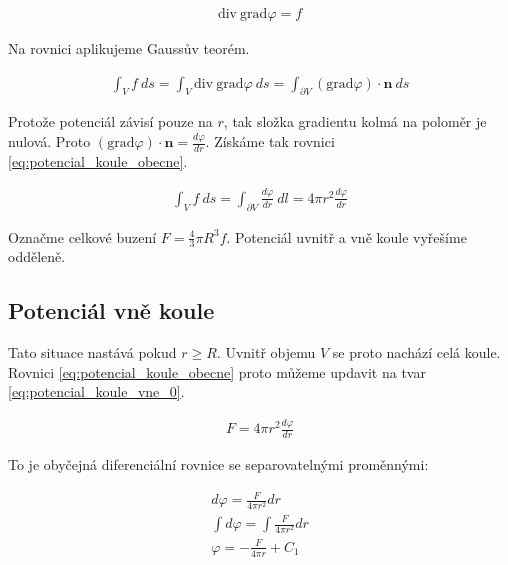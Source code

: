\documentclass{book}
\newcommand{\vect}[1]{\boldsymbol{#1}}
\newcommand{\grad}{\mathrm{grad}}
\newcommand{\diverg}{\mathrm{div}}
\begin{document}
\begin{equation}
\begin{split}
\diverg \ \grad \varphi = f
\end{split}
\end{equation}

Na rovnici aplikujeme Gaussův teorém.

\begin{equation}
\begin{split}
\int_V f \ ds = \int_V \diverg \ \grad \varphi \ ds = \int_{\partial V} (\grad \varphi) \cdot \vect{n} \ ds
\end{split}
\end{equation}

Protože potenciál závisí pouze na \(r\), tak složka gradientu kolmá na poloměr je nulová. Proto \((\grad \varphi) \cdot \vect{n} = \frac{d \varphi}{dr}\).
Získáme tak rovnici \eqref{eq:potencial_koule_obecne}.

\begin{equation}
\label{eq:potencial_koule_obecne}
\begin{split}
\int_V f \ ds = \int_{\partial V} \frac{d \varphi}{dr} \ dl = 4 \pi r^2 \frac{d \varphi}{dr}
\end{split}
\end{equation}

Označme celkové buzení \(F = \frac{4}{3} \pi R^3 f\).
Potenciál uvnitř a vně koule vyřešíme odděleně.

\subsection{Potenciál vně koule}

Tato situace nastává pokud \(r \geq R\). Uvnitř objemu \(V\) se proto nachází celá koule. Rovnici \eqref{eq:potencial_koule_obecne} proto můžeme updavit na tvar \eqref{eq:potencial_koule_vne_0}.

\begin{equation}
\label{eq:potencial_koule_vne_0}
\begin{split}
F = 4 \pi r^2 \frac{d \varphi}{dr}
\end{split}
\end{equation}

To je obyčejná diferenciální rovnice se separovatelnými proměnnými:

\begin{equation}
\label{eq:potencial_koule_vne_1}
\begin{split}
d \varphi = \frac{F}{4 \pi r^2} dr \\
\int d \varphi = \int \frac{F}{4 \pi r^2} dr \\
\varphi = -\frac{F}{4 \pi r} + C_1 \\
\end{split}
\end{equation}
\end{document}
